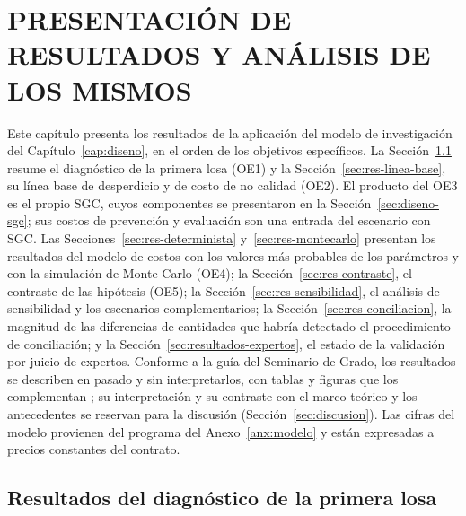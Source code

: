 \chapter{PRESENTACIÓN DE RESULTADOS Y ANÁLISIS DE LOS MISMOS}
\label{cap:resultados}

Este capítulo presenta los resultados de la aplicación del modelo de investigación del Capítulo~\ref{cap:diseno}, en el orden de los objetivos específicos. La Sección~\ref{sec:res-diagnostico} resume el diagnóstico de la primera losa (OE1) y la Sección~\ref{sec:res-linea-base}, su línea base de desperdicio y de costo de no calidad (OE2). El producto del OE3 es el propio SGC, cuyos componentes se presentaron en la Sección~\ref{sec:diseno-sgc}; sus costos de prevención y evaluación son una entrada del escenario con SGC. Las Secciones~\ref{sec:res-determinista} y~\ref{sec:res-montecarlo} presentan los resultados del modelo de costos con los valores más probables de los parámetros y con la simulación de Monte Carlo (OE4); la Sección~\ref{sec:res-contraste}, el contraste de las hipótesis (OE5); la Sección~\ref{sec:res-sensibilidad}, el análisis de sensibilidad y los escenarios complementarios; la Sección~\ref{sec:res-conciliacion}, la magnitud de las diferencias de cantidades que habría detectado el procedimiento de conciliación; y la Sección~\ref{sec:resultados-expertos}, el estado de la validación por juicio de expertos. Conforme a la guía del Seminario de Grado, los resultados se describen en pasado y sin interpretarlos, con tablas y figuras que los complementan \parencite[diapositivas~3 y~4]{barrios2021resultados}; su interpretación y su contraste con el marco teórico y los antecedentes se reservan para la discusión (Sección~\ref{sec:discusion}). Las cifras del modelo provienen del programa del Anexo~\ref{anx:modelo} y están expresadas a precios constantes del contrato.

\section{Resultados del diagnóstico de la primera losa}
\label{sec:res-diagnostico}

